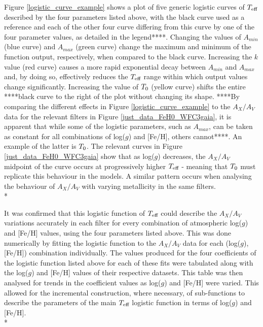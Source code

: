 \documentclass[12pt, a4paper]{report}
\begin{document}
Figure \ref{logistic_curve_example} shows a plot of five generic logistic curves of $T_{\textnormal{eff}}$ described by the four parameters listed above, with the black curve used as a reference and each of the other four curve differing from this curve by one of the four parameter values, as detailed in the legend****. Changing the values of $A_{min}$ (blue curve) and $A_{max}$ (green curve) change the maximum and minimum of the function output, respectively, when compared to the black curve. Increasing the $k$ value (red curve) causes a more rapid exponential decay between $A_{min}$ and $A_{max}$ and, by doing so, effectively reduces the $T_{\textnormal{eff}}$ range within which output values change significantly. Increasing the value of $T_{\textnormal{0}}$ (yellow curve) shifts the entire ****black curve to the right of the plot without changing its shape. ****By comparing the different effects in Figure \ref{logistic_curve_example} to the $A_{X}/A_{V}$ data for the relevant filters in Figure \ref{just_data_FeH0_WFC3gaia}, it is apparent that while some of the logistic parameters, such as $A_{max}$, can be taken as constant for all combinations of log($g$) and [Fe/H], others cannot****. An example of the latter is $T_{\textnormal{0}}$. The relevant curves in Figure \ref{just_data_FeH0_WFC3gaia} show that as log($g$) decreases, the $A_{X}/A_{V}$ midpoint of the curve occurs at progressively higher $T_{\textnormal{eff}}$ - meaning that $T_{\textnormal{0}}$ must replicate this behaviour in the models. A similar pattern occurs when analysing the behaviour of $A_{X}/A_{V}$ with varying metallicity in the same filters. \\*

It was confirmed that this logistic function of $T_{\textnormal{eff}}$ could describe the $A_{X}/A_{V}$ variations accurately in each filter for every combination of atmospheric log($g$) and [Fe/H] values, using the four parameters listed above. This was done numerically by fitting the logistic function to the $A_{X}/A_{V}$ data for each (log($g$),[Fe/H]) combination individually. The values produced for the four coefficients of the logistic function listed above for each of these fits were tabulated along with the log($g$) and [Fe/H] values of their respective datasets. This table was then analysed for trends in the coefficient values as log($g$) and [Fe/H] were varied. This allowed for the incremental construction, where necessary, of sub-functions to describe the parameters of the main $T_{\textnormal{eff}}$ logistic function in terms of log($g$) and [Fe/H].\\*
\end{document}
